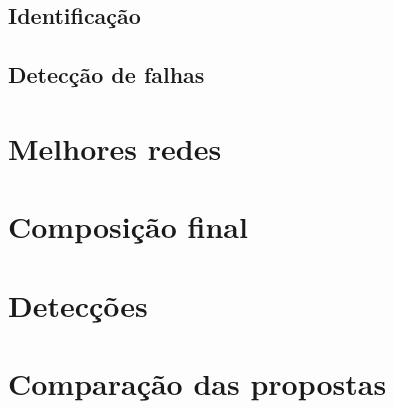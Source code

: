 \subsection{Identificação}

\subsection{Detecção de falhas}

\section{Melhores redes}

\section{Composição final}

\section{Detecções}

\section{Comparação das propostas}
